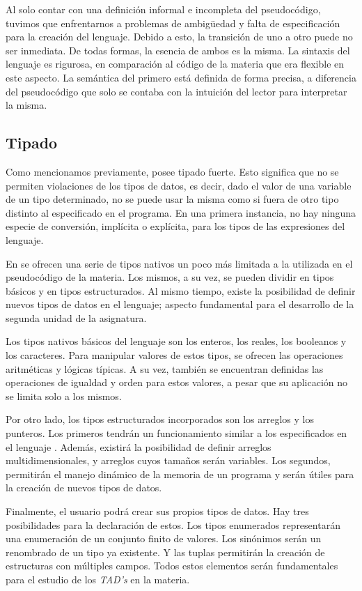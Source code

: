 Al solo contar con una definición informal e incompleta del pseudocódigo, tuvimos que enfrentarnos a problemas de ambigüedad y falta de especificación para la creación del lenguaje.
Debido a esto, la transición de uno a otro puede no ser inmediata.
De todas formas, la esencia de ambos es la misma.
La sintaxis del lenguaje es rigurosa, en comparación al código de la materia que era flexible en este aspecto.
La semántica del primero está definida de forma precisa, a diferencia del pseudocódigo que solo se contaba con la intuición del lector para interpretar la misma.

\subsection{Tipado}

Como mencionamos previamente, \Lenguaje{} posee tipado fuerte.
Esto significa que no se permiten violaciones de los tipos de datos, es decir, dado el valor de una variable de un tipo determinado, no se puede usar la misma como si fuera de otro tipo distinto al especificado en el programa.
En una primera instancia, no hay ninguna especie de conversión, implícita o explícita, para los tipos de las expresiones del lenguaje.

En \Lenguaje{} se ofrecen una serie de tipos nativos un poco más limitada a la utilizada en el pseudocódigo de la materia.
Los mismos, a su vez, se pueden dividir en tipos básicos y en tipos estructurados.
Al mismo tiempo, existe la posibilidad de definir nuevos tipos de datos en el lenguaje; aspecto fundamental para el desarrollo de la segunda unidad de la asignatura.

Los tipos nativos básicos del lenguaje son los enteros, los reales, los booleanos y los caracteres.
Para manipular valores de estos tipos, se ofrecen las operaciones aritméticas y lógicas típicas.
A su vez, también se encuentran definidas las operaciones de igualdad y orden para estos valores, a pesar que su aplicación no se limita solo a los mismos.

Por otro lado, los tipos estructurados incorporados son los arreglos y los punteros.
Los primeros tendrán un funcionamiento similar a los especificados en el lenguaje \C{}.
Además, existirá la posibilidad de definir arreglos multidimensionales, y arreglos cuyos tamaños serán variables.
Los segundos, permitirán el manejo dinámico de la memoria de un programa y serán útiles para la creación de nuevos tipos de datos.

Finalmente, el usuario podrá crear sus propios tipos de datos.
Hay tres posibilidades para la declaración de estos.
Los tipos enumerados representarán una enumeración de un conjunto finito de valores.
Los sinónimos serán un renombrado de un tipo ya existente.
Y las tuplas permitirán la creación de estructuras con múltiples campos.
Todos estos elementos serán fundamentales para el estudio de los \textit{TAD's} en la materia.

